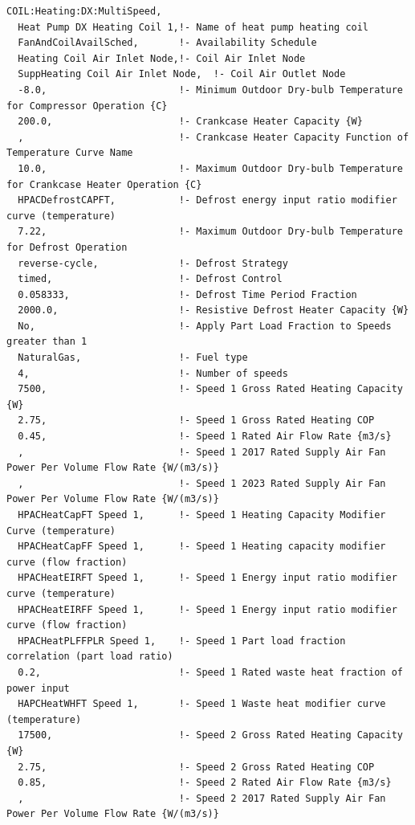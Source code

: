 \begin{lstlisting}
COIL:Heating:DX:MultiSpeed,
  Heat Pump DX Heating Coil 1,!- Name of heat pump heating coil
  FanAndCoilAvailSched,       !- Availability Schedule
  Heating Coil Air Inlet Node,!- Coil Air Inlet Node
  SuppHeating Coil Air Inlet Node,  !- Coil Air Outlet Node
  -8.0,                       !- Minimum Outdoor Dry-bulb Temperature for Compressor Operation {C}
  200.0,                      !- Crankcase Heater Capacity {W}
  ,                           !- Crankcase Heater Capacity Function of Temperature Curve Name
  10.0,                       !- Maximum Outdoor Dry-bulb Temperature for Crankcase Heater Operation {C}
  HPACDefrostCAPFT,           !- Defrost energy input ratio modifier curve (temperature)
  7.22,                       !- Maximum Outdoor Dry-bulb Temperature for Defrost Operation
  reverse-cycle,              !- Defrost Strategy
  timed,                      !- Defrost Control
  0.058333,                   !- Defrost Time Period Fraction
  2000.0,                     !- Resistive Defrost Heater Capacity {W}
  No,                         !- Apply Part Load Fraction to Speeds greater than 1
  NaturalGas,                 !- Fuel type
  4,                          !- Number of speeds
  7500,                       !- Speed 1 Gross Rated Heating Capacity {W}
  2.75,                       !- Speed 1 Gross Rated Heating COP
  0.45,                       !- Speed 1 Rated Air Flow Rate {m3/s}
  ,                           !- Speed 1 2017 Rated Supply Air Fan Power Per Volume Flow Rate {W/(m3/s)}
  ,                           !- Speed 1 2023 Rated Supply Air Fan Power Per Volume Flow Rate {W/(m3/s)}
  HPACHeatCapFT Speed 1,      !- Speed 1 Heating Capacity Modifier Curve (temperature)
  HPACHeatCapFF Speed 1,      !- Speed 1 Heating capacity modifier curve (flow fraction)
  HPACHeatEIRFT Speed 1,      !- Speed 1 Energy input ratio modifier curve (temperature)
  HPACHeatEIRFF Speed 1,      !- Speed 1 Energy input ratio modifier curve (flow fraction)
  HPACHeatPLFFPLR Speed 1,    !- Speed 1 Part load fraction correlation (part load ratio)
  0.2,                        !- Speed 1 Rated waste heat fraction of power input
  HAPCHeatWHFT Speed 1,       !- Speed 1 Waste heat modifier curve (temperature)
  17500,                      !- Speed 2 Gross Rated Heating Capacity {W}
  2.75,                       !- Speed 2 Gross Rated Heating COP
  0.85,                       !- Speed 2 Rated Air Flow Rate {m3/s}
  ,                           !- Speed 2 2017 Rated Supply Air Fan Power Per Volume Flow Rate {W/(m3/s)}

\end{lstlisting}
